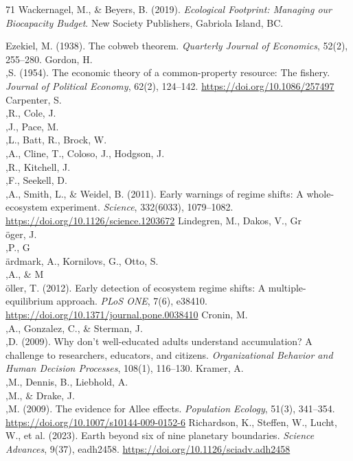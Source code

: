 \documentclass[twocolumn,10pt]{article}
\begin{document}
\begin{thebibliography}{71}
 Wackernagel, M., \& Beyers, B. (2019). \textit{Ecological Footprint: Managing our Biocapacity Budget}. New Society Publishers, Gabriola Island, BC.

 Ezekiel, M. (1938). The cobweb theorem. \textit{Quarterly Journal of Economics}, 52(2), 255--280.
 Gordon, H.\\,S. (1954). The economic theory of a common-property resource: The fishery. \textit{Journal of Political Economy}, 62(2), 124--142. \url{https://doi.org/10.1086/257497}
 Carpenter, S.\\,R., Cole, J.\\,J., Pace, M.\\,L., Batt, R., Brock, W.\\,A., Cline, T., Coloso, J., Hodgson, J.\\,R., Kitchell, J.\\,F., Seekell, D.\\,A., Smith, L., \& Weidel, B. (2011). Early warnings of regime shifts: A whole-ecosystem experiment. \textit{Science}, 332(6033), 1079--1082. \url{https://doi.org/10.1126/science.1203672}
 Lindegren, M., Dakos, V., Gr\\\"oger, J.\\,P., G\\\"ardmark, A., Kornilovs, G., Otto, S.\\,A., \& M\\\"oller, T. (2012). Early detection of ecosystem regime shifts: A multiple-equilibrium approach. \textit{PLoS ONE}, 7(6), e38410. \url{https://doi.org/10.1371/journal.pone.0038410}
 Cronin, M.\\,A., Gonzalez, C., \& Sterman, J.\\,D. (2009). Why don't well-educated adults understand accumulation? A challenge to researchers, educators, and citizens. \textit{Organizational Behavior and Human Decision Processes}, 108(1), 116--130.
 Kramer, A.\\,M., Dennis, B., Liebhold, A.\\,M., \& Drake, J.\\,M. (2009). The evidence for Allee effects. \textit{Population Ecology}, 51(3), 341--354. \url{https://doi.org/10.1007/s10144-009-0152-6}
 Richardson, K., Steffen, W., Lucht, W., et al. (2023). Earth beyond six of nine planetary boundaries. \textit{Science Advances}, 9(37), eadh2458. \url{https://doi.org/10.1126/sciadv.adh2458}

\end{thebibliography}
\end{document}
